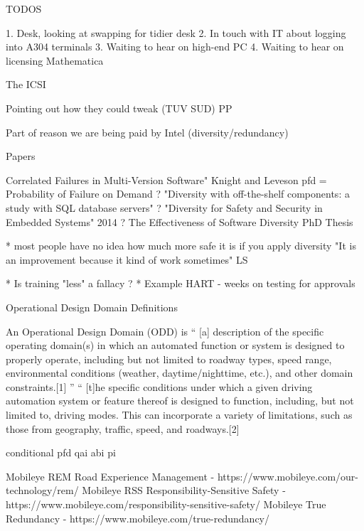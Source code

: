 TODOS

1. Desk, looking at swapping for tidier desk
2. In touch with IT about logging into A304 terminals
3. Waiting to hear on high-end PC
4. Waiting to hear on licensing Mathematica

The ICSI
    
Pointing out how they could tweak (TUV SUD) PP

Part of reason we are being paid by Intel (diversity/redundancy)

Papers

Correlated Failures in Multi-Version Software" Knight and Leveson
pfd =  Probability of Failure on Demand ?
"Diversity with off-the-shelf components: a study with SQL database servers"  ?
"Diversity for Safety and Security in Embedded Systems"  2014 ?
The Effectiveness of Software Diversity PhD Thesis

* most people have no idea how much more safe it is if you apply diversity
"It is an improvement because it kind of work sometimes" LS

* Is training "less" a fallacy ?
* Example HART - weeks on testing for approvals

Operational Design Domain
Definitions

An Operational Design Domain (ODD) is
“ 	[a] description of the specific operating domain(s) in which an automated function or system is designed to properly operate, including but not limited to roadway types, speed range, environmental conditions (weather, daytime/nighttime, etc.), and other domain constraints.[1] 	”
“ 	[t]he specific conditions under which a given driving automation system or feature thereof is designed to function, including, but not limited to, driving modes. This can incorporate a variety of limitations, such as those from geography, traffic, speed, and roadways.[2]

conditional pfd  qai abi pi

Mobileye REM Road Experience Management - https://www.mobileye.com/our-technology/rem/
Mobileye RSS Responsibility-Sensitive Safety - https://www.mobileye.com/responsibility-sensitive-safety/
Mobileye True Redundancy - https://www.mobileye.com/true-redundancy/

